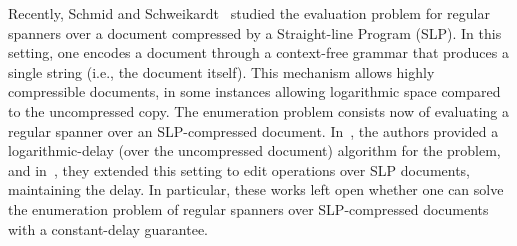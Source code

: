 
%
Recently, Schmid and Schweikardt~\cite{SchmidS21,SchmidS22} studied the evaluation problem for regular spanners over a document compressed by a Straight-line Program (SLP). In this setting, one encodes a document through a context-free grammar that produces a single string (i.e., the document itself). This mechanism allows highly compressible documents, in some instances allowing logarithmic space compared to the uncompressed copy.
The enumeration problem consists now of evaluating a regular spanner over an SLP-compressed document. In~\cite{SchmidS21}, the authors provided a logarithmic-delay (over the uncompressed document) algorithm for the 
problem, and in~\cite{SchmidS22}, they extended this setting to edit operations over SLP documents, maintaining the delay. In particular, these works left open whether one can solve the enumeration problem of regular spanners over SLP-compressed documents with a constant-delay guarantee. 


